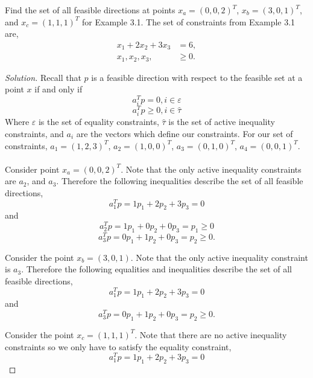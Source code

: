\documentclass[12pt]{article}
\makeatletter
\theoremstyle{homework}
\newenvironment{exercise}[1]
{\def\@currentlabel{#1}\exercisecore}
{\endexercisecore}
\makeatother
\begin{document}
\begin{exercise}{1.1} Find the set of all feasible directions at points $x_a = (0, 0, 2)^T$, $x_b = (3, 0, 1)^T$, and $x_c = (1, 1, 1)^T$ for Example 3.1. The set of constraints from Example 3.1 are, 
  \begin{align*}
    x_1 + 2x_2 + 3x_3 &= 6,\\
    x_1, x_2, x_3, &\geq 0.
  \end{align*}
  \begin{proof}[Solution]
    Recall that $p$ is a feasible direction with respect to the feasible set at a point $x$ if and only if 
    \begin{equation*}
      a_i^Tp = 0, i \in \varepsilon 
    \end{equation*}
    \begin{equation*}
      a_i^Tp \geq 0, i \in \hat{\tau}  
    \end{equation*}
    Where $\varepsilon$ is the set of equality constraints, $\hat{\tau}$ is the set of active inequality constraints, and 
    $a_i$ are the vectors which define our constraints. For our set of constraints, $a_1 = (1, 2, 3)^T$,
    $a_2 = (1, 0, 0)^T$, $a_3 = (0, 1, 0)^T$, $a_4 = (0, 0, 1)^T$.\\\\
    Consider point $x_a = (0, 0, 2)^T$. Note that the only active inequality constraints are $a_2$, and $a_3$. 
    Therefore the following inequalities describe the set of all feasible directions, 
    \begin{equation*}
      a_1^Tp = 1p_1 + 2p_2 + 3p_3 = 0
    \end{equation*}
    and 
    \begin{equation*}
      a_2^Tp = 1p_1 + 0p_2 + 0p_3 = p_1 \geq 0
    \end{equation*}
    \begin{equation*}
      a_3^Tp = 0p_1 + 1p_2 + 0p_3 = p_2 \geq 0.
    \end{equation*}

    Consider the point $x_b = (3, 0, 1)$. Note that the only active inequality constraint is $a_3$. Therefore the following equalities and inequalities describe the set of all feasible directions, 
    \begin{equation*}
      a_1^Tp = 1p_1 + 2p_2 + 3p_3 = 0
    \end{equation*}
    and 
    \begin{equation*}
      a_3^Tp = 0p_1 + 1p_2 + 0p_3 = p_2 \geq 0.
    \end{equation*}

    Consider the point $x_c = (1, 1, 1)^T$. Note that there are no active inequality constraints so we only have to satisfy the equality constraint, 
    \begin{equation*}
      a_1^Tp = 1p_1 + 2p_2 + 3p_3 = 0
    \end{equation*}
  
  \end{proof}
\end{exercise}
\vspace{.5in}
\end{document}
